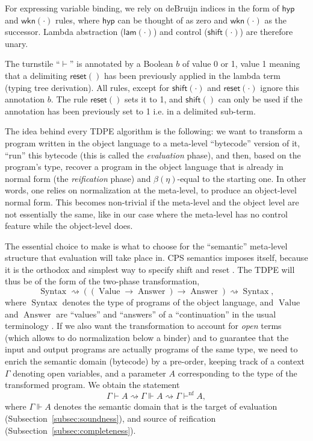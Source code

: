 \documentclass{eptcs}
\newcommand{\hyp}{\mathsf{hyp}}
\newcommand{\wkn}[1]{\mathsf{wkn}{(#1)}}
\newcommand{\lam}[1]{\mathsf{lam}{(#1)}}
\newcommand{\reset}[1]{\mathsf{reset}{(#1)}}
\newcommand{\shift}[1]{\mathsf{shift}{(#1)}}
\DeclareMathOperator{\Syn}{Syntax}
\DeclareMathOperator{\Val}{Value}
\DeclareMathOperator{\Ans}{Answer}
\newcommand{\normal}{{\!\!\text{nf}}}
\theoremstyle{definition}
\theoremstyle{plain}
\theoremstyle{remark}
\begin{document}
For expressing variable binding, we rely on deBruijn indices in the form of $\hyp$ and $\wkn{\cdot}$ rules, where $\hyp$ can be thought of as zero and $\wkn{\cdot}$ as the successor. Lambda abstraction ($\lam{\cdot}$) and control ($\shift{\cdot}$) are therefore unary.

The turnstile ``$\vdash$'' is annotated by a Boolean $b$ of value 0 or 1, value 1 meaning that a delimiting $\reset{}$ has been previously applied in the lambda term (typing tree derivation). All rules, except for $\shift{\cdot}$ and $\reset{\cdot}$ ignore this annotation $b$. The rule $\reset{}$ sets it to 1, and $\shift{}$ can only be used if the annotation has been previously set to 1 i.e. in a delimited sub-term.

The idea behind every TDPE algorithm is the following: we want to transform a program written in the object language to a meta-level ``bytecode'' version of it, ``run'' this bytecode  (this is called the \emph{evaluation} phase), and then, based on the program's type, recover a program in the object language that is already in normal form (the \emph{reification} phase) and $\beta(\eta)$-equal to the starting one. In other words, one relies on normalization at the meta-level, to produce an object-level normal form. This becomes non-trivial if the meta-level and the object level are not essentially the same, like in our case where the meta-level has no control feature while the object-level does.

The essential choice to make is what to choose for the ``semantic'' meta-level structure that evaluation will take place in. CPS semantics imposes itself, because it is the orthodox and simplest way to specify shift and reset  \cite{DanvyF1992}. The TDPE will thus be of the form of the two-phase transformation,
\[
\Syn \rightsquigarrow \left(\left(\Val\to\Ans\right)\to\Ans\right) \rightsquigarrow \Syn,
\]
where $\Syn$ denotes the type of programs of the object language, and $\Val$ and $\Ans$ are ``values'' and ``answers'' of a ``continuation'' in the usual terminology \cite{Danvy1999}. If we also want the transformation to account for \emph{open} terms (which allows to do normalization below a binder) and to guarantee that the input and output programs are actually programs of the same type, we need to enrich the  semantic domain (bytecode) by a pre-order, keeping track of a context $\Gamma$ denoting open variables, and a parameter $A$ corresponding to the type of the transformed program. 
We obtain the statement
\[
\Gamma\vdash A \rightsquigarrow \Gamma \Vdash A \rightsquigarrow \Gamma\vdash^\normal A,
\]
where $\Gamma\Vdash A$ denotes the semantic domain that is the target of evaluation (Subsection~\ref{subsec:soundness}), and source of reification (Subsection~\ref{subsec:completeness}). 
\end{document}
